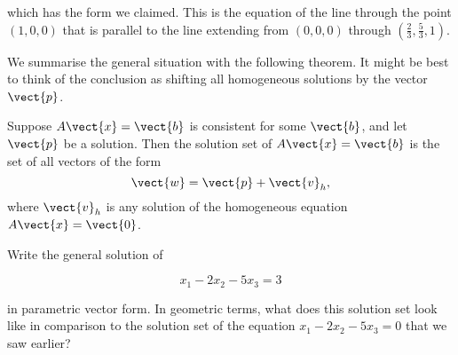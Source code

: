 \begin{example}
which has the form we claimed. This is the equation of the line through the point \((1,0,0)\) that is parallel to the line extending from \((0,0,0)\) through \(\left(\frac{2}{3}, \frac{5}{3}, 1\right)\).

\end{example}

We summarise the general situation with the following theorem. It might be best to think of the conclusion as shifting all homogeneous solutions by the vector $\vect{p}$.

\begin{theorem}
    Suppose $A \vect{x} = \vect{b}$ is consistent for some $\vect{b}$, and let $\vect{p}$ be a solution. Then the solution set of $A \vect{x} = \vect{b}$ is the set of all vectors of the form
    \[
    \vect{w} = \vect{p} + \vect{v}_h,
    \]
    where $\vect{v}_h$ is any solution of the homogeneous equation $A \vect{x} = \vect{0}$.
\end{theorem}

\begin{example} Write the general solution of

\[
x_1-2 x_2-5 x_3=3
\]

in parametric vector form. In geometric terms, what does this solution set look like in comparison to the solution set of the equation $x_1-2 x_2-5 x_3=0$ that we saw earlier?
\end{example}

